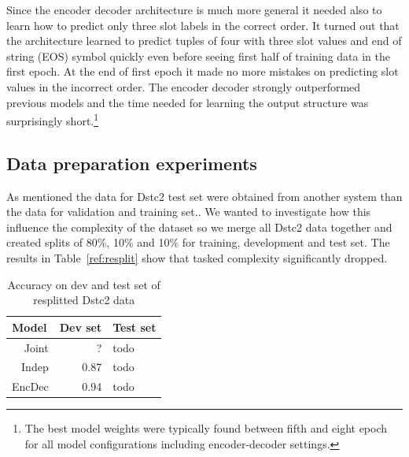 \documentclass{itatnew}
\begin{document}
Since the encoder decoder architecture is much more general it needed also to learn how to predict only three slot labels in the correct order.
It turned out that the architecture learned to predict tuples of four with three slot values and end of string (EOS) symbol quickly even before seeing first half of training data in the first epoch.
At the end of first epoch it made no more mistakes on predicting slot values in the incorrect order.
The encoder decoder strongly outperformed previous models and the time needed for learning the output structure was surprisingly short.\footnote{The best model weights were typically found between fifth and eight epoch for all model configurations including encoder-decoder settings.}

\subsection{Data preparation experiments}
\label{sec:split}
As mentioned the data for Dstc2 test set were obtained from another system than the data for validation and training set.\cite{verify and cite dstc2}.
We wanted to investigate how this influence the complexity of the dataset so we merge all Dstc2 data together and created splits of 80\%, 10\% and 10\% for training, development and test set.
The results in Table~\ref{ref:resplit} show that tasked complexity significantly dropped.

\begin{table}
\caption{Accuracy on dev and test set of resplitted Dstc2 data}
\begin{center}
\begin{tabular}{r@{\quad}rll}
\hline
\multicolumn{1}{l}{\rule{0pt}{12pt}
                   Model}&\multicolumn{1}{l}{Dev set}&\multicolumn{2}{l}{Test set}\\[2pt]
\hline\rule{0pt}{12pt}
Joint  &     ?&  todo \\
Indep  &   0.87 & todo \\
EncDec &   0.94 & todo \\
\hline
\end{tabular}
\end{center}
\label{tab:repslit}
\end{table}
\end{document}
